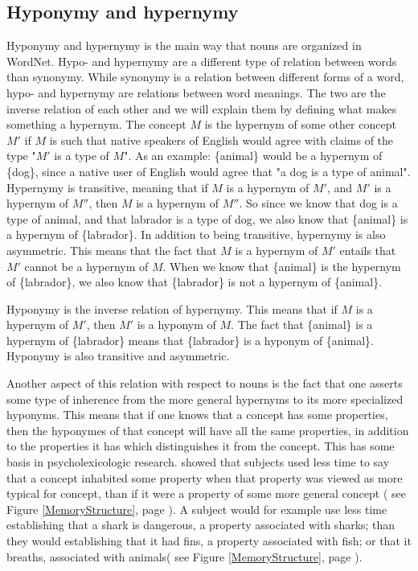 \subsection{Hyponymy and hypernymy}
Hyponymy and hypernymy is the main way that nouns are organized in WordNet.
Hypo- and hypernymy are a different type of relation between words than synonymy.
While synonymy is a relation between different forms of a word,
hypo- and hypernymy are relations between word meanings.
The two are the inverse relation of each other and we will explain them by defining what makes something a hypernym.
The concept $M$ is the hypernym of some other concept $M'$ if $M$ is such that native speakers of English would agree
with claims of the type "$M'$ is a type of $M$".
As an example: \{animal\} would be a hypernym of \{dog\},
since a native user of English would agree that "a dog is a type of animal".
Hypernymy is transitive, meaning that if $M$ is a hypernym of $M'$, and $M'$ is a hypernym of $M''$,
then $M$ is a hypernym of $M''$.
So since we know that dog is a type of animal, and that labrador is a type of dog,
we also know that \{animal\} is a hypernym of \{labrador\}.
In addition to being transitive, hypernymy is also asymmetric.
This means that the fact that $M$ is a hypernym of $M'$ entails that $M'$ cannot be a hypernym of $M$.
When we know that \{animal\} is the hypernym of \{labrador\},
we also know that \{labrador\} is not a hypernym of \{animal\}\citep{Miller1990}.

Hyponymy is the inverse relation of hypernymy.
This means that if $M$ is a hypernym of $M'$, then $M'$ is a hyponym of $M$.
The fact that \{animal\} is a hypernym of \{labrador\} means that \{labrador\} is a hyponym of \{animal\}.
Hyponymy is also transitive and asymmetric\citep{Miller1990}.

Another aspect of this relation with respect to nouns is the fact that one asserts some type of inherence from the more
general hypernyms to its more specialized hyponyms.
This means that if one knows that a concept has some properties,
then the hyponymes of that concept will have all the same properties,
in addition to the properties it has which distinguishes it from the concept\citep{Miller1990a}.
This has some basis in psycholexicologic research.
\citet{Collins1969} showed that subjects used less time to say that a concept inhabited some property when that property
was viewed as more typical for concept, than if it were a property of some more general concept
( see Figure \ref{MemoryStructure}, page \pageref{MemoryStructure}).
A subject would for example use less time establishing that a shark is dangerous, a property associated with sharks;
than they would establishing that it had fins, a property associated with fish; or that it breaths, associated with animals( see Figure \ref{MemoryStructure}, page \pageref{MemoryStructure}).

